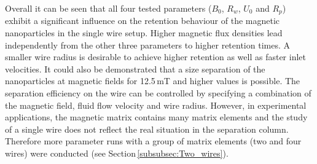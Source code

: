 \FloatBarrier
Overall it can be seen that all four tested parameters ($B_{0}$, $R_{w}$, $U_{0}$ and $R_{p}$) exhibit a significant influence on the retention behaviour of the magnetic nanoparticles in the single wire setup. Higher magnetic flux densities lead independently from the other three parameters to higher retention times. A smaller wire radius is desirable to achieve higher retention as well as faster inlet velocities. It could also be demonstrated that a size separation of the nanoparticles at magnetic fields for 12.5\,mT and higher values is possible. The separation efficiency on the wire can be controlled by specifying a combination of the magnetic field, fluid flow velocity and wire radius. However, in experimental applications, the magnetic matrix contains many matrix elements and the study of a single wire does not reflect the real situation in the separation column. Therefore more parameter runs with a group of matrix elements (two and four wires) were conducted (see Section\,\ref{subsubsec:Two_wires}).   




